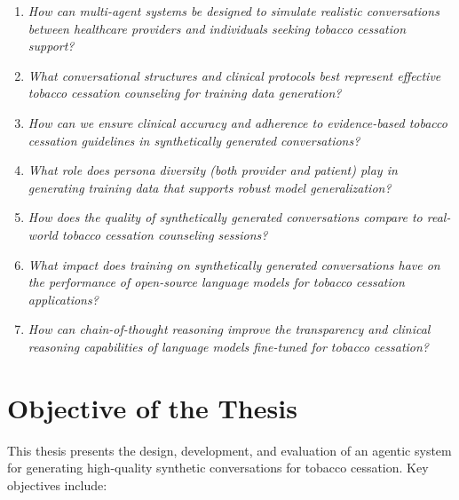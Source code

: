\begin{enumerate}[label=\textbf{RQ\arabic*.}, leftmargin=1.5cm, itemsep=0.3cm]
\item \textit{How can multi-agent systems be designed to simulate realistic conversations between healthcare providers and individuals seeking tobacco cessation support?}

\item \textit{What conversational structures and clinical protocols best represent effective tobacco cessation counseling for training data generation?}

\item \textit{How can we ensure clinical accuracy and adherence to evidence-based tobacco cessation guidelines in synthetically generated conversations?}

\item \textit{What role does persona diversity (both provider and patient) play in generating training data that supports robust model generalization?}

\item \textit{How does the quality of synthetically generated conversations compare to real-world tobacco cessation counseling sessions?}

\item \textit{What impact does training on synthetically generated conversations have on the performance of open-source language models for tobacco cessation applications?}

\item \textit{How can chain-of-thought reasoning improve the transparency and clinical reasoning capabilities of language models fine-tuned for tobacco cessation?}
\end{enumerate}

\section{Objective of the Thesis}
This thesis presents the design, development, and evaluation of an agentic system for generating high-quality synthetic conversations for tobacco cessation. Key objectives include:


